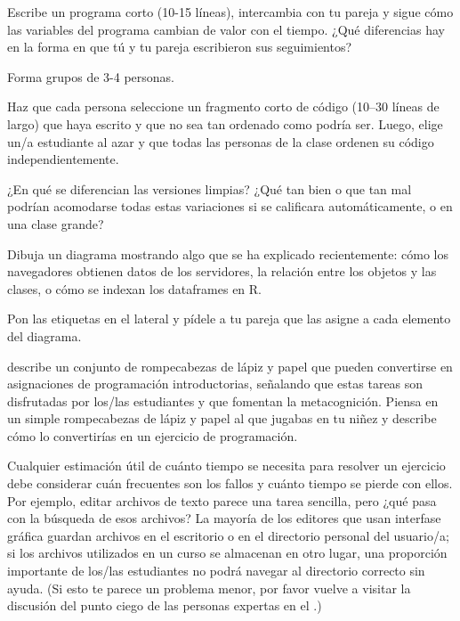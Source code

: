 
Escribe un programa corto (10-15 líneas),
 intercambia con tu pareja y 
sigue cómo las variables del programa cambian de valor con el tiempo.
¿Qué diferencias hay en la forma en que tú y tu pareja escribieron sus seguimientos?


Forma grupos de 3-4 personas.

Haz que cada persona seleccione un fragmento corto de código (10--30 líneas de largo) que haya escrito y que no sea tan ordenado como podría ser.
Luego, elige un/a estudiante al azar y que todas las personas de la clase ordenen su código independientemente.

¿En qué se diferencian las versiones limpias?
¿Qué tan bien o que tan mal podrían acomodarse todas estas variaciones si se calificara automáticamente, o en una clase grande?


Dibuja un diagrama mostrando algo que se ha explicado recientemente: cómo los navegadores obtienen datos de los servidores, la relación entre los objetos y las clases,
o cómo se indexan los dataframes en R.

Pon las etiquetas en el lateral y pídele a tu pareja que las asigne a cada elemento del diagrama.


\cite{Butl2017} describe un conjunto de rompecabezas de lápiz y papel que pueden convertirse en asignaciones de programación introductorias, señalando que estas tareas son disfrutadas por los/las estudiantes y que fomentan la metacognición.
Piensa en un simple rompecabezas de lápiz y papel al que jugabas en tu niñez
y describe cómo lo convertirías en un ejercicio de programación.

Cualquier estimación útil de cuánto tiempo se necesita para resolver un ejercicio 
debe considerar cuán frecuentes son los fallos y cuánto tiempo se pierde con ellos.
Por ejemplo, 
editar archivos de texto parece una tarea sencilla, 
pero ¿qué pasa con la búsqueda de esos archivos?
La mayoría de los editores que usan interfase gráfica guardan archivos en el escritorio o en el directorio personal del usuario/a; si los archivos utilizados en un curso se almacenan en otro lugar, una proporción importante de los/las estudiantes no podrá navegar al directorio correcto sin ayuda.
(Si esto te parece un problema menor, por favor vuelve a visitar la discusión del punto ciego de las personas expertas en el .)



